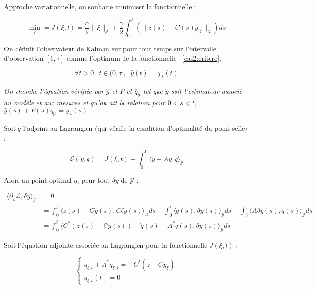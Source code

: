 \documentclass[a4paper]{article}
\begin{document}
Approche variationnelle, on souhaite minimiser la fonctionnelle :

\begin{equation}
	\label{cas2:critere}
	\displaystyle
	\min_{\xi} = J(\xi,t) = \frac{\alpha}{2}\|\xi \|_{\mathscr{Y}} 
	                      + \frac{\gamma}{2}\int_0^t (\|z(s)-C(s)y_{| \xi}\|_{\mathscr{Z}})ds
\end{equation}


On définit l'observateur de Kalman sur pour tout temps sur l'intervalle 
d'observation $[0,\tau]$ comme l'optimum de la fonctionnelle ~\eqref{cas2:critere}.

\[ \forall t>0, \; t\in (0,\tau], \; \; \hat{y}(t) = \bar{y}_{|t}(t) \]

\textit{On cherche l'équation vérifiée par $\hat{y}$ 
et $P$ et $\bar{q}_{|t}$ tel que 
$\hat{y}$ soit l'estimateur associé au modèle et aux mesures
et qu'on ait la relation pour $0<s<t$, 
$\hat{y}(s)+ P(s)\bar{q}_{|t} = \bar{y}_{|t}(s)$}

\vspace{0.3cm}
Soit $q$ l'adjoint au Lagrangien (qui vérifie la condition d'optimalité du point selle) :

\[ 
\mathscr{L}(y,q)= J(\xi,t)+\int_0^t \langle \dot{y}-Ay, q \rangle_{\mathscr{Y}}
\]

Alors au point optimal $q$, pour tout $\delta y$ de $\mathscr{Y}$ :

\[
\begin{split}
\langle \partial_y \mathscr{L}, \delta y \rangle_{\mathscr{Y}} & =0 \\ 
          &= \int_0^t \langle z(s) - Cy(s), C \delta y(s) \rangle_{\mathscr{Z}}ds
		   - \int_0^t \langle \dot{q}(s), \delta y(s) \rangle_{\mathscr{Y}}ds
		   - \int_0^t \langle A \delta y(s), q(s) \rangle_{\mathscr{Y}} ds\\
		  & = \int_0^t \langle C^* (z(s) - Cy(s))
		   - \dot{q}(s)
		   -A^* q(s)
		   , \delta y(s) \rangle_{\mathscr{Y}} ds
\end{split}
\]

Soit l'équation adjointe associée au Lagrangien pour la fonctionnelle $J(\xi,t)$ :

\begin{equation}
	\label{cas2:adjoint}
	\begin{cases}
	\dot{q}_{\xi,t} + A^* q_{\xi,t} = - C^*(z-Cy_{\xi}) \\
	q_{\xi,t}(t) =0
	\end{cases}
\end{equation}
\end{document}
